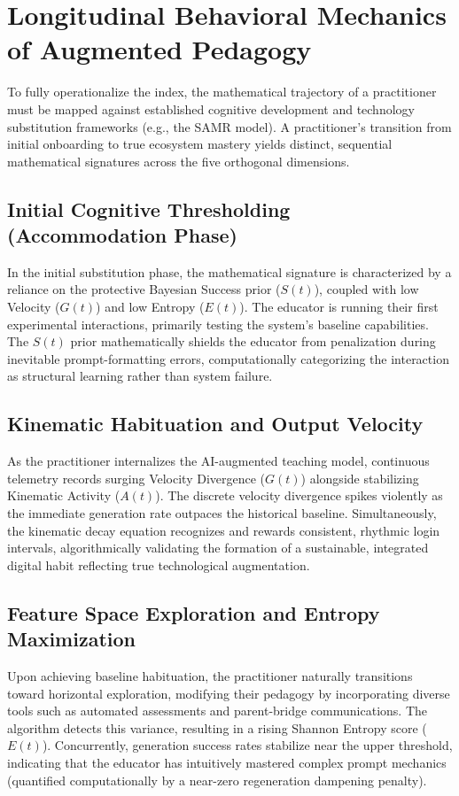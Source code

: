 \documentclass[11pt,a4paper]{article}
\begin{document}
\section{Longitudinal Behavioral Mechanics of Augmented Pedagogy}

To fully operationalize the index, the mathematical trajectory of a practitioner must be mapped against established cognitive development and technology substitution frameworks (e.g., the SAMR model). A practitioner's transition from initial onboarding to true ecosystem mastery yields distinct, sequential mathematical signatures across the five orthogonal dimensions.

\subsection{Initial Cognitive Thresholding (Accommodation Phase)}
In the initial substitution phase, the mathematical signature is characterized by a reliance on the protective Bayesian Success prior ($S(t)$), coupled with low Velocity ($G(t)$) and low Entropy ($E(t)$). The educator is running their first experimental interactions, primarily testing the system's baseline capabilities. The $S(t)$ prior mathematically shields the educator from penalization during inevitable prompt-formatting errors, computationally categorizing the interaction as structural learning rather than system failure.

\subsection{Kinematic Habituation and Output Velocity}
As the practitioner internalizes the AI-augmented teaching model, continuous telemetry records surging Velocity Divergence ($G(t)$) alongside stabilizing Kinematic Activity ($A(t)$). The discrete velocity divergence spikes violently as the immediate generation rate outpaces the historical baseline. Simultaneously, the kinematic decay equation recognizes and rewards consistent, rhythmic login intervals, algorithmically validating the formation of a sustainable, integrated digital habit reflecting true technological augmentation.

\subsection{Feature Space Exploration and Entropy Maximization}
Upon achieving baseline habituation, the practitioner naturally transitions toward horizontal exploration, modifying their pedagogy by incorporating diverse tools such as automated assessments and parent-bridge communications. The algorithm detects this variance, resulting in a rising Shannon Entropy score ($E(t)$). Concurrently, generation success rates stabilize near the upper threshold, indicating that the educator has intuitively mastered complex prompt mechanics (quantified computationally by a near-zero regeneration dampening penalty).
\end{document}

